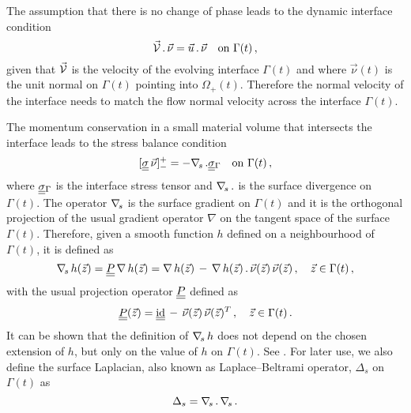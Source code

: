 The assumption that there is no change of phase leads to the dynamic interface
condition
\begin{equation}\label{eq:interface_velocity}
\vec{\mathcal{V}}\,.\,\vec\nu = \vec u\,.\,\vec \nu \quad \mbox{on }
\Gamma(t)\,,
\end{equation}
given that $\vec{\mathcal{V}}$ is the velocity of the evolving interface
$\Gamma(t)$ and where $\vec\nu(t)$ is the unit normal on $\Gamma(t)$ pointing
into $\Omega_+(t)$. Therefore the normal velocity of the interface needs to
match the flow normal velocity across the interface $\Gamma(t)$.

The momentum conservation in a small material volume that intersects the
interface leads to the stress balance condition
\begin{equation}\label{eq:interface_jump_stress_div}
[\mat\sigma\,\vec \nu]_-^+ = -\nabs\,.\mat\sigma_{\Gamma} \quad \mbox{on }
\Gamma(t)\,,
\end{equation}
where $\mat\sigma_{\Gamma}$ is the interface stress tensor and $\nabla_{\!s}\,.$ is
the surface divergence on $\Gamma(t)$. The operator $\nabla_{\!s}$ is the surface
gradient on $\Gamma(t)$ and it is the orthogonal projection of the usual
gradient operator $\nabla$ on the tangent space of the surface $\Gamma(t)$.
Therefore, given a smooth function $h$ defined on a neighbourhood of
$\Gamma(t)$, it is defined as
\begin{equation}\label{eq:surface_gradient}
\nabs\,h(\vec z)=\mat P\,\nabla\,h(\vec z)=\nabla\,h(\vec z)\,-
\,\nabla\,h(\vec z)\,.\,\vec\nu(\vec z)\,\vec\nu(\vec z)\,,\quad \vec z
\in\Gamma(t)\,,
\end{equation}
with the usual projection operator $\mat P$ defined as
\begin{equation}\label{eq:surface_projection}
\mat P(\vec z)=\mat\id\,-\,\vec\nu(\vec z)\,\vec\nu(\vec z)^T\,,\quad \vec
z\in \Gamma(t)\,.
\end{equation}
It can be shown that the definition of $\nabla_{\!s}\,h$ does not depend on the chosen
extension of $h$, but only on the value of $h$ on $\Gamma(t)$. See
\cite{DeckelnickDE05}. For later use, we also define the surface Laplacian, also
known as Laplace--Beltrami operator, $\Delta_s$ on $\Gamma(t)$ as
\begin{equation}\label{eq:surface_laplacian}
\Delta_s = \nabla_{\!s}\,.\,\nabla_{\!s}\,.
\end{equation}

